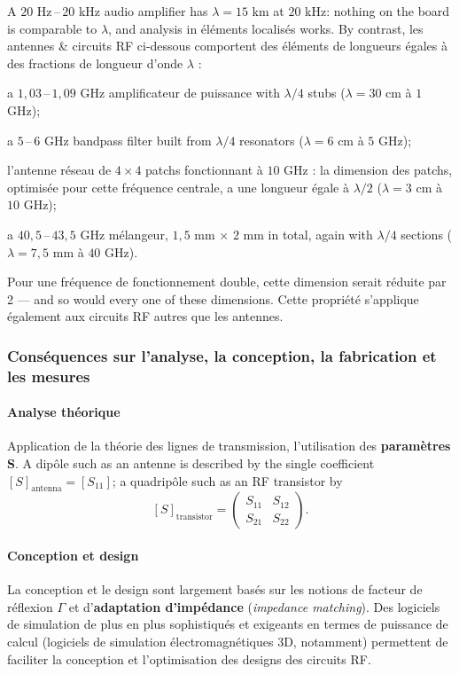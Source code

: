 \begin{example}
  A $20$ Hz\,--\,$20$ kHz audio amplifier has $\lambda = 15$ km at $20$ kHz:
  nothing on the board is comparable to $\lambda$, and analysis in éléments
  localisés works. By contrast, les antennes \& circuits RF ci-dessous
  comportent des éléments de longueurs égales à des fractions de longueur
  d'onde $\lambda$ :
  \begin{subpart}
    \item a $1{,}03$\,--\,$1{,}09$ GHz amplificateur de puissance with
      $\lambda/4$ stubs ($\lambda = 30$ cm à $1$ GHz);
    \item a $5$\,--\,$6$ GHz bandpass filter built from $\lambda/4$ resonators
      ($\lambda = 6$ cm à $5$ GHz);
    \item l'antenne réseau de $4\times 4$ patchs fonctionnant à $10$ GHz : la
      dimension des patchs, optimisée pour cette fréquence centrale, a une
      longueur égale à $\lambda/2$ ($\lambda = 3$ cm à $10$ GHz);
    \item a $40{,}5$\,--\,$43{,}5$ GHz mélangeur, $1{,}5$ mm $\times$ $2$ mm in
      total, again with $\lambda/4$ sections ($\lambda = 7{,}5$ mm à
      $40$ GHz).
  \end{subpart}
  Pour une fréquence de fonctionnement double, cette dimension serait réduite
  par 2 --- and so would every one of these dimensions. Cette propriété
  s'applique également aux circuits RF autres que les antennes.
\end{example}

\subsubsection{Conséquences sur l'analyse, la conception, la fabrication et les mesures}
\paragraph{Analyse théorique} Application de la théorie des lignes de
transmission, l'utilisation des \textbf{paramètres S}. A dipôle such as an
antenne is described by the single coefficient
$[S]_{\text{antenna}}=[S_{11}]$; a quadripôle such as an RF
transistor by
\[[S]_{\text{transistor}}=\begin{pmatrix} S_{11} & S_{12}\\ S_{21} & S_{22}\end{pmatrix}.\]

\paragraph{Conception et design} La conception et le design sont largement
basés sur les notions de facteur de réflexion $\Gamma$ et
d'\textbf{adaptation d'impédance} (\textit{impedance matching}). Des logiciels de simulation de plus en plus sophistiqués et
exigeants en termes de puissance de calcul (logiciels de simulation
électromagnétiques 3D, notamment) permettent de faciliter la conception et
l'optimisation des designs des circuits RF.

